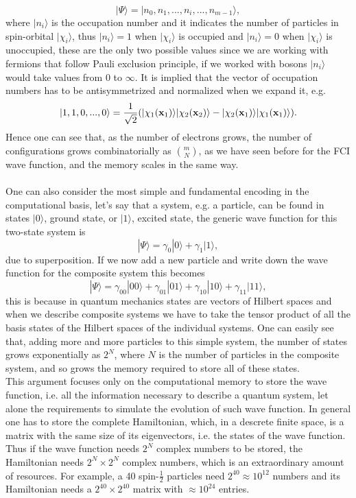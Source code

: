 \begin{equation}
    |\Psi\rangle = |n_0,n_1,...,n_i,...,n_{m-1}\rangle,
\end{equation}
where $|n_i\rangle$ is the occupation number and it indicates the number of particles in spin-orbital $|\chi_i\rangle$, thus $|n_i\rangle = 1$ when $|\chi_i\rangle$ is occupied and $|n_i\rangle = 0$ when $|\chi_i\rangle$ is unoccupied, these are the only two possible values since we are working with fermions that follow Pauli exclusion principle, if we worked with bosons $|n_i\rangle$ would take values from 0 to $\infty$. It is implied that the vector of occupation numbers has to be antisymmetrized and normalized when we expand it, e.g.
\begin{equation}
    |1,1,0,...,0\rangle = \frac{1}{\sqrt{2}} (|\chi_1({\bf x}_1)\rangle |\chi_2({\bf x}_2)\rangle - |\chi_2({\bf x}_1)\rangle |\chi_1({\bf x}_1)\rangle).
\end{equation}
Hence one can see that, as the number of electrons grows, the number of configurations grows combinatorially as $\binom{m}{N}$, as we have seen before for the FCI wave function, and the memory scales in the same way. \\
\\
One can also consider the most simple and fundamental encoding in the computational basis, let's say that a system, e.g. a particle, can be found in states $|0\rangle$, ground state, or $|1\rangle$, excited state, the generic wave function for this two-state system is
\begin{equation}
    |\Psi\rangle = \gamma_0 |0\rangle + \gamma_1 |1\rangle,
\end{equation}
due to superposition. If we now add a new particle and write down the wave function for the composite system this becomes
\begin{equation}
    |\Psi\rangle = \gamma_{00} |00\rangle + \gamma_{01} |01\rangle + \gamma_{10} |10\rangle + \gamma_{11} |11\rangle,
\end{equation}
this is because in quantum mechanics states are vectors of Hilbert spaces and when we describe composite systems we have to take the tensor product of all the basis states of the Hilbert spaces of the individual systems. One can easily see that, adding more and more particles to this simple system, the number of states grows exponentially as $2^N$, where $N$ is the number of particles in the composite system, and so grows the memory required to store all of these states. \\
This argument focuses only on the computational memory to store the wave function, i.e. all the information necessary to describe a quantum system, let alone the requirements to simulate the evolution of such wave function. In general one has to store the complete Hamiltonian, which, in a descrete finite space, is a matrix with the same size of its eigenvectors, i.e. the states of the wave function. Thus if the wave function needs $2^N$ complex numbers to be stored, the Hamiltonian needs $2^N \times 2^N$ complex numbers, which is an extraordinary amount of resources. For example, a 40 spin-$\frac12$ particles need $2^{40} \approx 10^{12}$ numbers and its Hamiltonian needs a $2^{40} \times 2^{40}$ matrix with $\approx 10^{24}$ entries. \\
